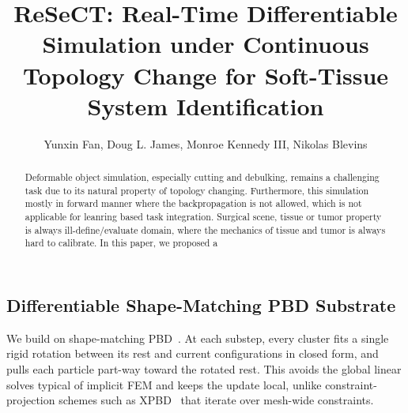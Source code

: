 \documentclass[letterpaper, 10 pt, conference]{ieeeconf}  %
\title{\LARGE \bf
ReSeCT: Real-Time Differentiable Simulation under Continuous Topology Change for Soft-Tissue System Identification
}
\author{Yunxin Fan, Doug L. James, Monroe Kennedy III, Nikolas Blevins}
\theoremstyle{tight}
\begin{document}
\maketitle
\thispagestyle{empty}
\pagestyle{empty}


\begin{abstract}

Deformable object simulation, especially cutting and debulking, remains a challenging task due to its natural property of topology changing. Furthermore, this simulation mostly in forward manner where the backpropagation is not allowed, which is not applicable for leanring based task integration. Surgical scene, tissue or tumor property is always ill-define/evaluate domain, where the mechanics of tissue and tumor is always hard to calibrate. In this paper, we proposed a 

\end{abstract}


\subsection{Differentiable Shape-Matching PBD Substrate}
\label{sec:pbd-substrate}

We build on shape-matching PBD~\cite{muller2005}. At each substep,
every cluster fits a single rigid rotation between its rest and
current configurations in closed form, and pulls each particle
part-way toward the rotated rest. This avoids the global linear solves
typical of implicit FEM and keeps the update local, unlike
constraint-projection schemes such as XPBD~\cite{macklin2016xpbd}
that iterate over mesh-wide constraints.
\end{document}
